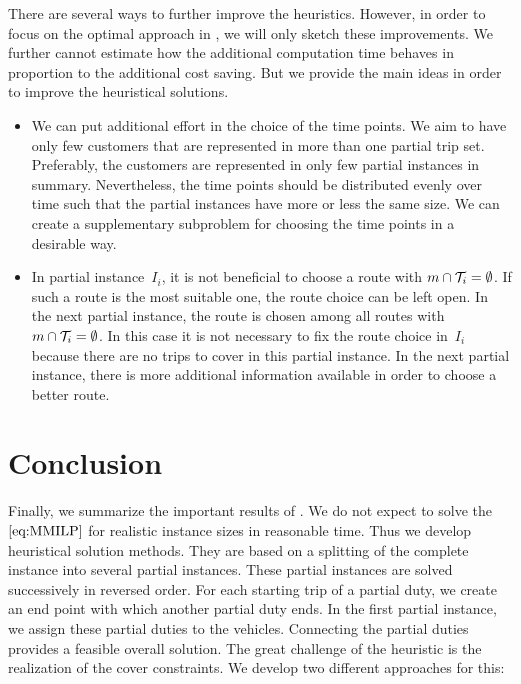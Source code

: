There are several ways to further improve the heuristics. However, in order to focus on the optimal approach in , we will only sketch these improvements. We further cannot estimate how the additional computation time behaves in proportion to the additional cost saving. But we provide the main ideas in order to improve the heuristical solutions.
\begin{itemize}
	\item
We can put additional effort in the choice of the time points. We aim to have only few customers that are represented in more than one partial trip set. Preferably, the customers are represented in only few partial instances in summary. Nevertheless, the time points should be distributed evenly over time such that the partial instances have more or less the same size. We can create a supplementary subproblem for choosing the time points in a desirable way.
	\item
In partial instance~$I_i$, it is not beneficial to choose a route with ${m\cap\mathcal{T}_i=\emptyset}$. If such a route is the most suitable one, the route choice can be left open. In the next partial instance, the route is chosen among all routes with ${m\cap\mathcal{T}_i=\emptyset}$. In this case it is not necessary to fix the route choice in~$I_i$ because there are no trips to cover in this partial instance. In the next partial instance, there is more additional information available in order to choose a better route.
\end{itemize}


\section{Conclusion}
\label{sec:heuristics_conclusion}

Finally, we summarize the important results of . We do not expect to solve the $\eqref{eq:MMILP}$ for realistic instance sizes in reasonable time. Thus we develop heuristical solution methods. They are based on a splitting of the complete instance into several partial instances. These partial instances are solved successively in reversed order. For each starting trip of a partial duty, we create an end point with which another partial duty ends. In the first partial instance, we assign these partial duties to the vehicles. Connecting the partial duties provides a feasible overall solution. The great challenge of the heuristic is the realization of the cover constraints. We develop two different approaches for this:

